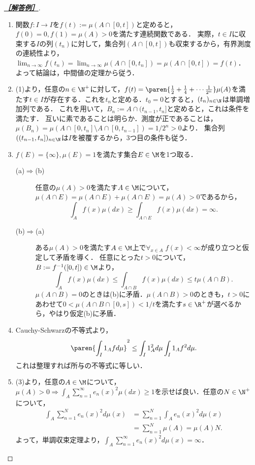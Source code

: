 \documentclass[uplatex,dvipdfmx]{jsarticle}
\begin{document}
\begin{proof}[\textbf{\underline{［解答例］}}]\mbox{}
    \begin{enumerate}
        \item 関数$f:I\to I$を$f(t):=\mu(A\cap[0,t])$と定めると，$f(0)=0,f(1)=\mu(A)>0$を満たす連続関数である．
        実際，$t\in I$に収束する$I$の列$(t_n)$に対して，集合列$(A\cap [0,t])$も収束するから，有界測度の連続性より，$\lim_{n\to\infty}f(t_n)=\lim_{n\to\infty}\mu(A\cap [0,t_n])=\mu(A\cap[0,t])=f(t)$．
        よって結論は，中間値の定理から従う．
        \item (1)より，任意の$n\in\N^+$に対して，$f(t)=\paren{\frac{1}{2}+\frac{1}{4}+\cdots\frac{1}{2^n}}\mu(A)$を満たす$t\in I$が存在する．これを$t_n$と定める．$t_0=0$とすると，$(t_n)_{n\in\N}$は単調増加列である．
        これを用いて，$B_n:=A\cap(t_{n-1},t_n]$と定めると，これは条件を満たす．
        互いに素であることは明らか．測度が正であることは，$\mu(B_n)=\mu(A\cap[0,t_n]\setminus A\cap[0,t_{n-1}])=1/2^n>0$より．
        集合列$((t_{n-1},t_n])_{n\in\N}$は$I$を被覆するから，3つ目の条件も従う．
        \item $f(E)=\{\infty\},\mu(E)=1$を満たす集合$E\in\M$を1つ取る．
        \begin{description}
            \item[(a)$\Rightarrow$(b)] 任意の$\mu(A)>0$を満たす$A\in\M$について，$\mu(A\cap E)=\mu(A\cap E)+\mu(A\cap E^\comp)=\mu(A)>0$であるから，
            \[\int_Af(x)\mu(dx)\ge\int_{A\cap E}f(x)\mu(dx)=\infty.\]
            \item[(b)$\Rightarrow$(a)] ある$\mu(A)>0$を満たす$A\in\M$上で$\forall_{x\in A}\;f(x)<\infty$が成り立つと仮定して矛盾を導く．
            任意にとった$t>0$について，$B:=f^{-1}([0,t])\in\M$より，
            \[\int_Af(x)\mu(dx)\le\int_{A\cap B}f(x)\mu(dx)\le t\mu(A\cap B).\]
            $\mu(A\cap B)=0$のときは(b)に矛盾．$\mu(A\cap B)>0$のときも，$t>0$にあわせて$0<\mu(A\cap B\cap[0,s])<1/t$を満たす$s\in\R^+$が選べるから，やはり仮定(b)に矛盾．
        \end{description}
        \item Cauchy-Schwarzの不等式より，
        \[\paren{\int_I1_Afd\mu}^2\le\int_I1^2_Ad\mu\int_I1_Af^2d\mu.\]
        これは整理すれば所与の不等式に等しい．
        \item (3)より，任意の$A\in\M$について，$\mu(A)>0\Rightarrow\int_A\sum_{n=1}^\infty e_n(x)^2\mu(dx)\ge1$を示せば良い．任意の$N\in\N^+$について，
        \begin{align*}
            \int_A\sum_{n=1}^Ne_n(x)^2d\mu(x)&=\sum_{n=1}^N\int_Ae_n(x)^2d\mu(x)\\
            &=\sum_{n=1}^N\mu(A)=\mu(A)N.
        \end{align*}
        よって，単調収束定理より，$\int_A\sum^\infty_{n=1}e_n(x)^2d\mu(x)=\infty$．
    \end{enumerate}
\end{proof}
\end{document}
